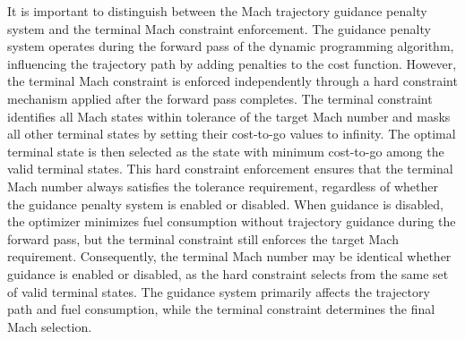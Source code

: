 It is important to distinguish between the Mach trajectory guidance penalty system and the terminal Mach constraint enforcement. The guidance penalty system operates during the forward pass of the dynamic programming algorithm, influencing the trajectory path by adding penalties to the cost function. However, the terminal Mach constraint is enforced independently through a hard constraint mechanism applied after the forward pass completes. The terminal constraint identifies all Mach states within tolerance of the target Mach number and masks all other terminal states by setting their cost-to-go values to infinity. The optimal terminal state is then selected as the state with minimum cost-to-go among the valid terminal states. This hard constraint enforcement ensures that the terminal Mach number always satisfies the tolerance requirement, regardless of whether the guidance penalty system is enabled or disabled. When guidance is disabled, the optimizer minimizes fuel consumption without trajectory guidance during the forward pass, but the terminal constraint still enforces the target Mach requirement. Consequently, the terminal Mach number may be identical whether guidance is enabled or disabled, as the hard constraint selects from the same set of valid terminal states. The guidance system primarily affects the trajectory path and fuel consumption, while the terminal constraint determines the final Mach selection.
